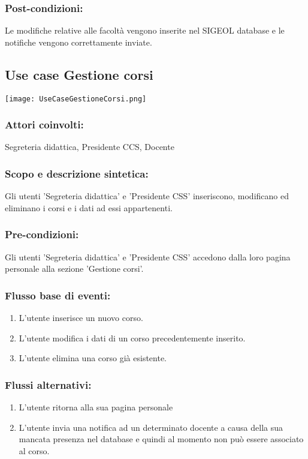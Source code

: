 \documentclass[11pt,a4paper]{article}
\begin{document}
\subsubsection*{Post-condizioni:}
Le modifiche relative alle facoltà vengono inserite nel SIGEOL database e le notifiche vengono correttamente 
inviate.

\subsection{Use case Gestione corsi}
\begin{center} 
 \texttt{[image: UseCaseGestioneCorsi.png]}
\end{center}
\subsubsection*{Attori coinvolti:}
Segreteria didattica, Presidente CCS, Docente
\subsubsection*{Scopo e descrizione sintetica:}
Gli utenti 'Segreteria didattica' e 'Presidente CSS' inseriscono, modificano ed eliminano i corsi e i dati ad essi appartenenti.
\subsubsection*{Pre-condizioni:}
Gli utenti 'Segreteria didattica' e 'Presidente CSS' accedono dalla loro pagina personale alla sezione 'Gestione corsi'.
\subsubsection*{Flusso base di eventi:}
\begin{enumerate}
 \item L'utente inserisce un nuovo corso. 
 \item L'utente modifica i dati di un corso precedentemente inserito.
 \item L'utente elimina una corso già esistente.
\end{enumerate}
\subsubsection*{Flussi alternativi:}
\begin{enumerate} 
\item L'utente ritorna alla sua pagina personale
\item L'utente invia una notifica ad un determinato docente a causa della sua mancata presenza nel database e quindi al momento non può essere associato al corso.
\end{enumerate}
\end{document}
